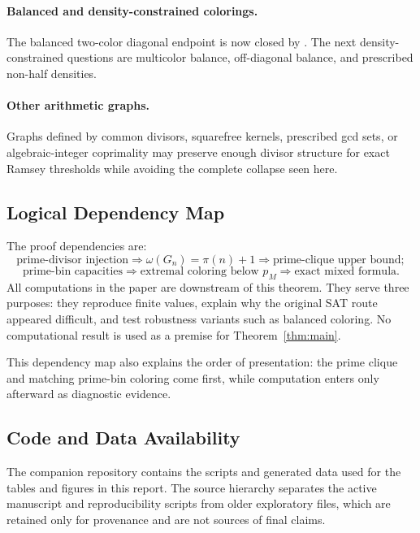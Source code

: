 \documentclass[11pt]{article}
\theoremstyle{plain}
\theoremstyle{definition}
\theoremstyle{remark}
\begin{document}
\paragraph{Balanced and density-constrained colorings.}
The balanced two-color diagonal endpoint is now closed by
.  The next density-constrained questions are
multicolor balance, off-diagonal balance, and prescribed non-half densities.

\paragraph{Other arithmetic graphs.}
Graphs defined by common divisors, squarefree kernels, prescribed gcd sets,
or algebraic-integer coprimality may preserve enough divisor structure for
exact Ramsey thresholds while avoiding the complete collapse seen here.

\subsection{Logical Dependency Map}
\label{app:dependency-map}

The proof dependencies are:
\[
\text{prime-divisor injection}
\Longrightarrow
\omega(G_n)=\pi(n)+1
\Longrightarrow
\text{prime-clique upper bound};
\]
\[
\text{prime-bin capacities}
\Longrightarrow
\text{extremal coloring below }p_M
\Longrightarrow
\text{exact mixed formula}.
\]
All computations in the paper are downstream of this theorem.  They serve
three purposes: they reproduce finite values, explain why the original SAT
route appeared difficult, and test robustness variants such as balanced
coloring.  No computational result is used as a premise for
Theorem~\ref{thm:main}.

This dependency map also explains the order of presentation: the prime
clique and matching prime-bin coloring come first, while computation enters
only afterward as diagnostic evidence.

\subsection{Code and Data Availability}
\label{app:code}

The companion repository contains the scripts and generated data used for
the tables and figures in this report.  The source hierarchy separates the
active manuscript and reproducibility scripts from older exploratory files,
which are retained only for provenance and are not sources of final claims.
\end{document}

